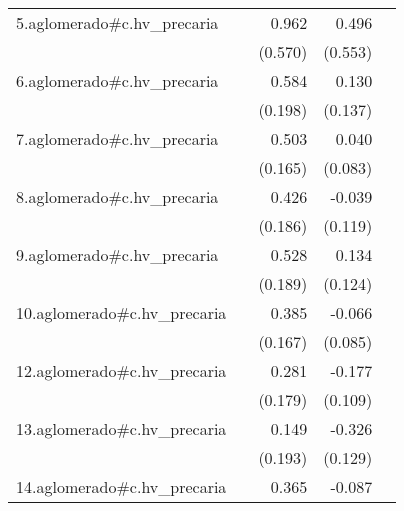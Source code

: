 {\begin{longtable}{l*{4}{D{.}{.}{-1}}}
\addlinespace
5.aglomerado#c.hv\_precaria&                     &       0.962         &       0.496         &                     \\
            &                     &     (0.570)         &     (0.553)         &                     \\
\addlinespace
6.aglomerado#c.hv\_precaria&                     &       0.584\sym{**} &       0.130         &                     \\
            &                     &     (0.198)         &     (0.137)         &                     \\
\addlinespace
7.aglomerado#c.hv\_precaria&                     &       0.503\sym{**} &       0.040         &                     \\
            &                     &     (0.165)         &     (0.083)         &                     \\
\addlinespace
8.aglomerado#c.hv\_precaria&                     &       0.426\sym{*}  &      -0.039         &                     \\
            &                     &     (0.186)         &     (0.119)         &                     \\
\addlinespace
9.aglomerado#c.hv\_precaria&                     &       0.528\sym{**} &       0.134         &                     \\
            &                     &     (0.189)         &     (0.124)         &                     \\
\addlinespace
10.aglomerado#c.hv\_precaria&                     &       0.385\sym{*}  &      -0.066         &                     \\
            &                     &     (0.167)         &     (0.085)         &                     \\
\addlinespace
12.aglomerado#c.hv\_precaria&                     &       0.281         &      -0.177         &                     \\
            &                     &     (0.179)         &     (0.109)         &                     \\
\addlinespace
13.aglomerado#c.hv\_precaria&                     &       0.149         &      -0.326\sym{*}  &                     \\
            &                     &     (0.193)         &     (0.129)         &                     \\
\addlinespace
14.aglomerado#c.hv\_precaria&                     &       0.365\sym{*}  &      -0.087         &                     \\

\end{longtable}}
